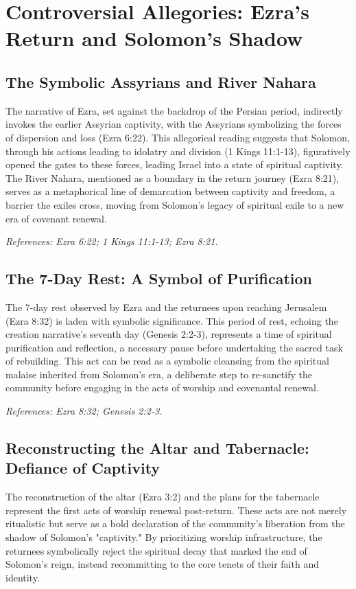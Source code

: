 \section{Controversial Allegories: Ezra's Return and Solomon's Shadow}

\subsection{The Symbolic Assyrians and River Nahara}

The narrative of Ezra, set against the backdrop of the Persian period, indirectly invokes the earlier Assyrian captivity, with the Assyrians symbolizing the forces of dispersion and loss (Ezra 6:22). This allegorical reading suggests that Solomon, through his actions leading to idolatry and division (1 Kings 11:1-13), figuratively opened the gates to these forces, leading Israel into a state of spiritual captivity. The River Nahara, mentioned as a boundary in the return journey (Ezra 8:21), serves as a metaphorical line of demarcation between captivity and freedom, a barrier the exiles cross, moving from Solomon's legacy of spiritual exile to a new era of covenant renewal.

\textit{References: Ezra 6:22; 1 Kings 11:1-13; Ezra 8:21.}

\subsection{The 7-Day Rest: A Symbol of Purification}

The 7-day rest observed by Ezra and the returnees upon reaching Jerusalem (Ezra 8:32) is laden with symbolic significance. This period of rest, echoing the creation narrative's seventh day (Genesis 2:2-3), represents a time of spiritual purification and reflection, a necessary pause before undertaking the sacred task of rebuilding. This act can be read as a symbolic cleansing from the spiritual malaise inherited from Solomon's era, a deliberate step to re-sanctify the community before engaging in the acts of worship and covenantal renewal.

\textit{References: Ezra 8:32; Genesis 2:2-3.}

\subsection{Reconstructing the Altar and Tabernacle: Defiance of Captivity}

The reconstruction of the altar (Ezra 3:2) and the plans for the tabernacle represent the first acts of worship renewal post-return. These acts are not merely ritualistic but serve as a bold declaration of the community's liberation from the shadow of Solomon's "captivity." By prioritizing worship infrastructure, the returnees symbolically reject the spiritual decay that marked the end of Solomon's reign, instead recommitting to the core tenets of their faith and identity.

